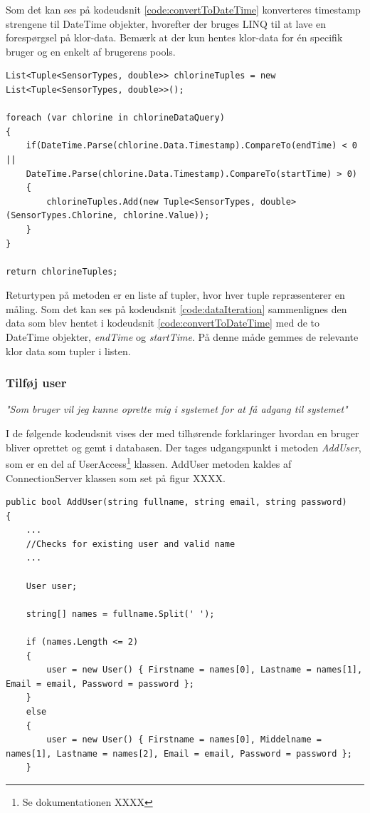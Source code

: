 Som det kan ses på kodeudsnit \ref{code:convertToDateTime} konverteres timestamp strengene til DateTime objekter, hvorefter der bruges LINQ til at lave en forespørgsel på klor-data. Bemærk at der kun hentes klor-data for én specifik bruger og en enkelt af brugerens pools.

\begin{lstlisting}[caption=Iteration over indhentet pool data,label=code:dataIteration]
List<Tuple<SensorTypes, double>> chlorineTuples = new List<Tuple<SensorTypes, double>>();

foreach (var chlorine in chlorineDataQuery)
{
	if(DateTime.Parse(chlorine.Data.Timestamp).CompareTo(endTime) < 0 ||
	DateTime.Parse(chlorine.Data.Timestamp).CompareTo(startTime) > 0)
	{
		chlorineTuples.Add(new Tuple<SensorTypes, double>(SensorTypes.Chlorine, chlorine.Value));
	}
}

return chlorineTuples;
\end{lstlisting}

Returtypen på metoden er en liste af tupler, hvor hver tuple repræsenterer en måling. Som det kan ses på kodeudsnit \ref{code:dataIteration} sammenlignes den data som blev hentet i kodeudsnit \ref{code:convertToDateTime} med de to DateTime objekter, \textit{endTime} og \textit{startTime}. På denne måde gemmes de relevante klor data som tupler i listen.

\subsubsection{Tilføj user}

\textit{"Som bruger vil jeg kunne oprette mig i systemet for at få adgang til systemet"}

I de følgende kodeudsnit vises der med tilhørende forklaringer hvordan en bruger bliver oprettet og gemt i databasen. Der tages udgangspunkt i metoden \textit{AddUser}, som er en del af UserAccess\footnote{Se dokumentationen XXXX} klassen. AddUser metoden kaldes af ConnectionServer klassen  som set på figur XXXX.
 
\begin{lstlisting}[caption=User laves lokalt hvorefter User's navne properties sættes, label=code:adduser1]
public bool AddUser(string fullname, string email, string password)
{
	...
	//Checks for existing user and valid name
	...
	
	User user;

	string[] names = fullname.Split(' ');

	if (names.Length <= 2)
	{
		user = new User() { Firstname = names[0], Lastname = names[1], Email = email, Password = password };
	}
	else
	{
		user = new User() { Firstname = names[0], Middelname = names[1], Lastname = names[2], Email = email, Password = password };
	}
\end{lstlisting}

